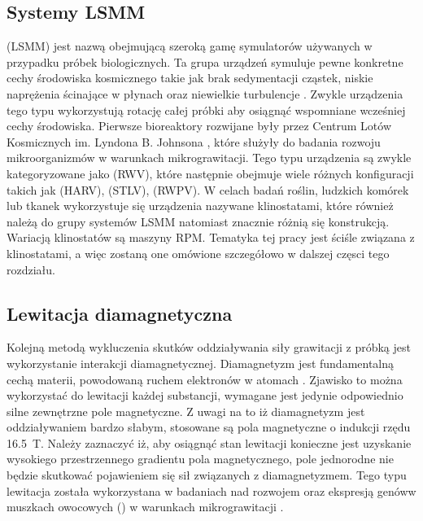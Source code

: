 \subsection{Systemy LSMM}

 (LSMM) jest nazwą obejmującą szeroką gamę symulatorów używanych w przypadku próbek
 biologicznych. Ta grupa urządzeń symuluje pewne konkretne cechy środowiska kosmicznego
  takie jak brak sedymentacji cząstek, niskie naprężenia ścinające w płynach oraz niewielkie
   turbulencje \cite{bib:lsmm1}. Zwykle urządzenia tego typu wykorzystują rotację całej
    próbki aby osiągnąć wspomniane wcześniej cechy środowiska. Pierwsze bioreaktory
     rozwijane były przez Centrum Lotów Kosmicznych im. Lyndona B. Johnsona
       \cite{bib:lsmm1}, które służyły do badania rozwoju mikroorganizmów w warunkach
       mikrograwitacji. Tego typu urządzenia są zwykle kategoryzowane jako   (RWV), które
        następnie obejmuje wiele różnych konfiguracji takich jak  (HARV),  (STLV),  (RWPV). W
         celach badań roślin, ludzkich komórek lub tkanek wykorzystuje się urządzenia
          nazywane klinostatami, które również należą do grupy systemów
           LSMM \cite{bib:nasa_space_biology} natomiast znacznie różnią się konstrukcją.
            Wariacją klinostatów są maszyny RPM. Tematyka tej pracy jest ściśle związana
             z klinostatami, a więc zostaną one omówione szczegółowo w dalszej częsci
              tego rozdziału.

\subsection{Lewitacja diamagnetyczna}

Kolejną metodą wykluczenia skutków oddziaływania siły grawitacji z próbką jest
 wykorzystanie interakcji diamagnetycznej. Diamagnetyzm jest fundamentalną cechą
  materii, powodowaną ruchem elektronów w atomach \cite{bib:kittel}. Zjawisko to można
   wykorzystać do lewitacji każdej substancji, wymagane jest jedynie odpowiednio silne
    zewnętrzne pole magnetyczne. Z uwagi na to iż diamagnetyzm jest oddziaływaniem
     bardzo słabym, stosowane są pola magnetyczne o indukcji rzędu \SI{16.5}{T}. Należy
      zaznaczyć iż, aby osiągnąć stan lewitacji konieczne jest uzyskanie wysokiego
       przestrzennego gradientu pola magnetycznego, pole jednorodne nie będzie skutkować
        pojawieniem się sił związanych z diamagnetyzmem. Tego typu lewitacja została
         wykorzystana w badaniach nad rozwojem oraz ekspresją genów\linebreak w muszkach owocowych
          () w warunkach
           mikrograwitacji \cite{bib:lewitacja}.

